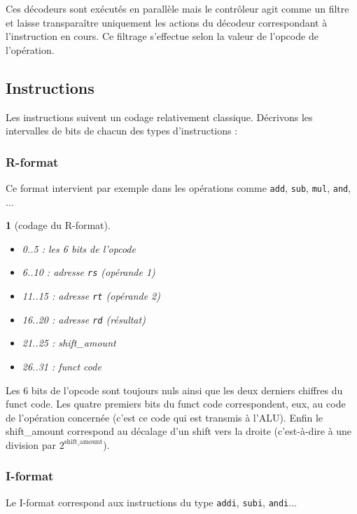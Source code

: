 \documentclass[13pt]{article}
\newtheorem{format}{  }
\begin{document}
Ces décodeurs sont exécutés en parallèle mais le contrôleur agit comme un filtre
et laisse transparaître uniquement les actions du décodeur correspondant à l'instruction en cours.
Ce filtrage s'effectue selon la valeur de l'opcode de l'opération.

\subsection{Instructions}

Les instructions suivent un codage relativement classique.
Décrivons les intervalles de bits de chacun des types d'instructions :


\subsubsection{R-format}

Ce format intervient par exemple dans les opérations 
comme \texttt{add}, \texttt{sub}, \texttt{mul}, \texttt{and}, ...

\begin{format}[codage du R-format]
  \begin{itemize}
  \item 0..5 : les 6 bits de l'opcode
  \item 6..10 : adresse \texttt{rs} (opérande 1)
  \item 11..15 : adresse \texttt{rt} (opérande 2)
  \item 16..20 : adresse \texttt{rd} (résultat)
  \item 21..25 : shift\_amount
  \item 26..31 : funct code
  \end{itemize}
\end{format}

Les 6 bits de l'opcode sont toujours nuls ainsi que les deux derniers chiffres
du funct code. Les quatre premiers bits du funct code correspondent, eux, au
code de l'opération concernée (c'est ce code qui est transmis à l'ALU). Enfin le
shift\_amount correspond au décalage d'un shift vers la droite (c'est-à-dire à
une division par $2^{\text{shift\_amount}}$).

\subsubsection{I-format}

Le I-format correspond aux instructions du type \texttt{addi}, \texttt{subi},
\texttt{andi}...
\end{document}
